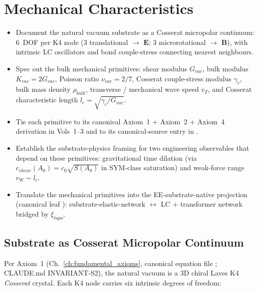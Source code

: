\chapter{Mechanical Characteristics}
\label{ch:vol9_mechanical_characteristics}

\begin{objectivebox}
\begin{itemize}
    \item Document the natural vacuum substrate as a Cosserat micropolar continuum: 6~DOF per K4 node (3 translational $\to$ $\mathbf{E}$; 3 microrotational $\to$ $\mathbf{B}$), with intrinsic LC oscillators and bond couple-stress connecting nearest neighbours.
    \item Spec out the bulk mechanical primitives: shear modulus $G_{vac}$, bulk modulus $K_{vac} = 2 G_{vac}$, Poisson ratio $\nu_{vac} = 2/7$, Cosserat couple-stress modulus $\gamma_c$, bulk mass density $\rho_{bulk}$, transverse / mechanical wave speed $v_T$, and Cosserat characteristic length $l_c = \sqrt{\gamma_c / G_{vac}}$.
    \item Tie each primitive to its canonical Axiom~1 + Axiom~2 + Axiom~4 derivation in Vols~1--3 and to its canonical-source entry in .
    \item Establish the substrate-physics framing for two engineering observables that depend on these primitives: gravitational time dilation (via $c_{shear}(A_0) = c_0 \sqrt{S(A_0)}$ in SYM-class saturation) and weak-force range $r_W \sim l_c$.
    \item Translate the mechanical primitives into the EE-substrate-native projection (canonical leaf ): substrate-elastic-network $\leftrightarrow$ LC + transformer network bridged by $\xi_{topo}$.
\end{itemize}
\end{objectivebox}

\section{Substrate as Cosserat Micropolar Continuum}
\label{sec:vol9_mech_cosserat_continuum}

Per Axiom~1 (Ch.~\ref{ch:fundamental_axioms}, canonical equation file ; CLAUDE.md INVARIANT-S2), the natural vacuum is a 3D chiral Laves K4 \emph{Cosserat} crystal. Each K4 node carries six intrinsic degrees of freedom:

